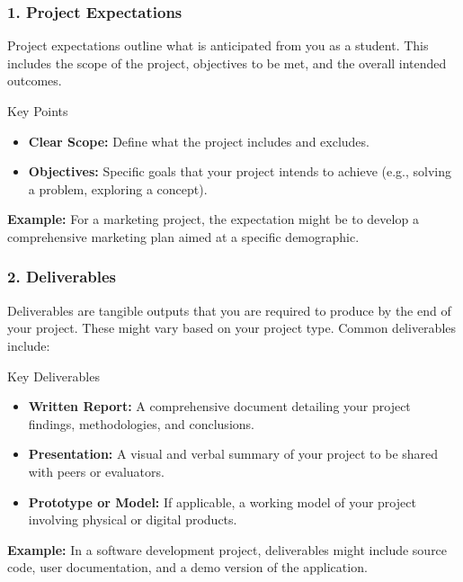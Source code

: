 \documentclass[aspectratio=169]{beamer}
\begin{document}
\begin{frame}[fragile]
    \frametitle{1. Project Expectations}
    Project expectations outline what is anticipated from you as a student. This includes the scope of the project, objectives to be met, and the overall intended outcomes. 

    \begin{block}{Key Points}
        \begin{itemize}
            \item \textbf{Clear Scope:} Define what the project includes and excludes.
            \item \textbf{Objectives:} Specific goals that your project intends to achieve (e.g., solving a problem, exploring a concept).
        \end{itemize}
    \end{block}

    \textbf{Example:} For a marketing project, the expectation might be to develop a comprehensive marketing plan aimed at a specific demographic.
\end{frame}

\begin{frame}[fragile]
    \frametitle{2. Deliverables}
    Deliverables are tangible outputs that you are required to produce by the end of your project. These might vary based on your project type. Common deliverables include:

    \begin{block}{Key Deliverables}
        \begin{itemize}
            \item \textbf{Written Report:} A comprehensive document detailing your project findings, methodologies, and conclusions.
            \item \textbf{Presentation:} A visual and verbal summary of your project to be shared with peers or evaluators.
            \item \textbf{Prototype or Model:} If applicable, a working model of your project involving physical or digital products.
        \end{itemize}
    \end{block}

    \textbf{Example:} In a software development project, deliverables might include source code, user documentation, and a demo version of the application.
\end{frame}
\end{document}
